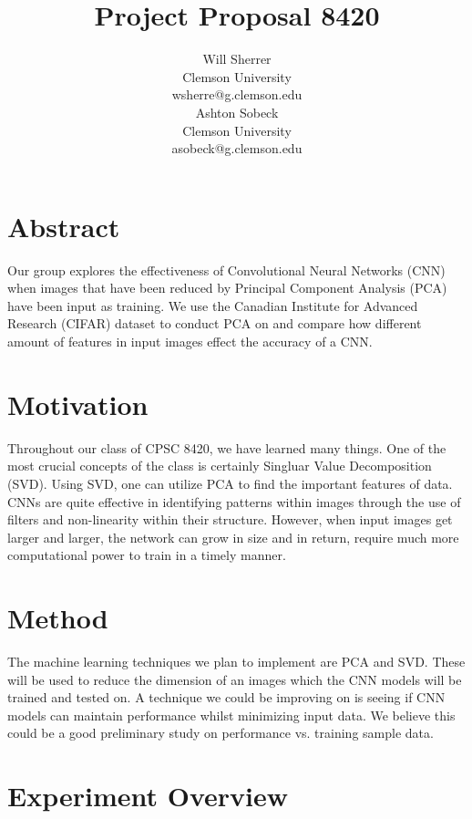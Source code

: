\documentclass{article}
\title{Project Proposal 8420}
\author{%
	Will Sherrer \\
	Clemson University\\
	wsherre@g.clemson.edu \\
	\And Ashton Sobeck \\
	Clemson University\\
	asobeck@g.clemson.edu
}
\begin{document}
\maketitle
\section{Abstract} 

Our group explores the effectiveness of Convolutional Neural Networks (CNN) 
  when  images that have been reduced by Principal Component Analysis (PCA) have 
  been input as training.  We use the Canadian Institute for Advanced 
  Research (CIFAR) dataset to conduct PCA on and compare how different amount of 
  features in input images effect the accuracy of a CNN.

\section{Motivation}

Throughout our class of CPSC 8420, we have learned many things. 
One of the most crucial concepts of the class is certainly Singluar Value 
Decomposition (SVD). Using SVD, one can utilize PCA to find the important 
features of data. CNNs are quite effective in identifying patterns within 
images through the use of filters and non-linearity within their structure. 
However, when input images get larger and larger, the network can grow in 
size and in return, require much more computational power to train in a timely manner.

\section{Method}

The machine learning techniques we plan to implement are PCA and SVD. These will be used to reduce the dimension of an images which the CNN models will be trained and tested on. A technique we could be improving on is seeing if CNN models can maintain performance whilst minimizing input data. We believe this could be a good preliminary study on performance vs. training sample data. 

\section{Experiment Overview}
\end{document}
